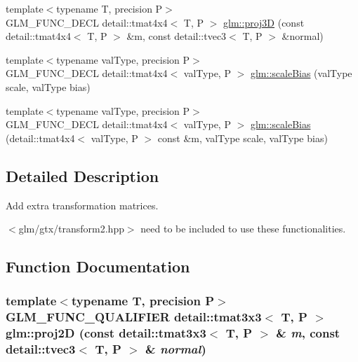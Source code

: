 \begin{CompactItemize}
\item 
{\footnotesize template$<$typename T, precision P$>$ }\\GLM\_\-FUNC\_\-DECL detail::tmat4x4$<$ T, P $>$ \hyperlink{group__gtx__transform2_gea404ce6c1541825232f418242bff9fb}{glm::proj3D} (const detail::tmat4x4$<$ T, P $>$ \&m, const detail::tvec3$<$ T, P $>$ \&normal)
\item 
{\footnotesize template$<$typename valType, precision P$>$ }\\GLM\_\-FUNC\_\-DECL detail::tmat4x4$<$ valType, P $>$ \hyperlink{group__gtx__transform2_gd75c85daca353804c161589fe32ce107}{glm::scaleBias} (valType scale, valType bias)
\item 
{\footnotesize template$<$typename valType, precision P$>$ }\\GLM\_\-FUNC\_\-DECL detail::tmat4x4$<$ valType, P $>$ \hyperlink{group__gtx__transform2_g235e65153daa1bdc12fcc07c8019931b}{glm::scaleBias} (detail::tmat4x4$<$ valType, P $>$ const \&m, valType scale, valType bias)
\end{CompactItemize}


\subsection{Detailed Description}
Add extra transformation matrices. 

$<$glm/gtx/transform2.hpp$>$ need to be included to use these functionalities. 

\subsection{Function Documentation}
\hypertarget{group__gtx__transform2_gcee3ec4d06d03a1cf9f4037c4effc2e4}{
\subsubsection[proj2D]{\setlength{\rightskip}{0pt plus 5cm}template$<$typename T, precision P$>$ GLM\_\-FUNC\_\-QUALIFIER detail::tmat3x3$<$ T, P $>$ glm::proj2D (const detail::tmat3x3$<$ T, P $>$ \& {\em m}, \/  const detail::tvec3$<$ T, P $>$ \& {\em normal})}}
\label{group__gtx__transform2_gcee3ec4d06d03a1cf9f4037c4effc2e4}


